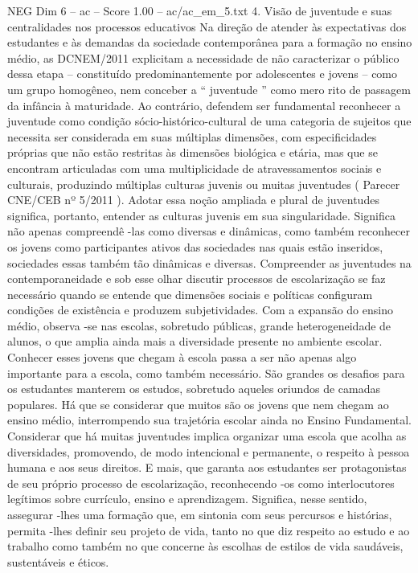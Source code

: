 \begin{textsample}{NEG Dim 6 – ac – Score 1.00 – ac/ac\_em\_5.txt}  \label{ex:f6_neg_134}
4.
Visão de juventude e suas centralidades nos processos educativos Na direção de atender às expectativas dos estudantes e às demandas da sociedade contemporânea para a formação no ensino médio, as DCNEM/2011 explicitam a necessidade de não caracterizar o público dessa etapa – constituído predominantemente por adolescentes e jovens – como um grupo homogêneo, nem conceber a “ juventude ” como mero rito de passagem da infância à maturidade.
Ao contrário, defendem ser fundamental reconhecer a juventude como condição sócio-histórico-cultural de uma categoria de sujeitos que necessita ser considerada em suas múltiplas dimensões, com especificidades próprias que não estão restritas às dimensões biológica e etária, mas que se encontram articuladas com uma multiplicidade de atravessamentos sociais e culturais, produzindo múltiplas culturas juvenis ou muitas juventudes ( Parecer CNE/CEB nº 5/2011 ).
Adotar essa noção ampliada e plural de juventudes significa, portanto, entender as culturas juvenis em sua singularidade.
Significa não apenas compreendê -las como diversas e dinâmicas, como também reconhecer os jovens como participantes ativos das sociedades nas quais estão inseridos, sociedades essas também tão dinâmicas e diversas.
Compreender as juventudes na contemporaneidade e sob esse olhar discutir processos de escolarização se faz necessário quando se entende que dimensões sociais e políticas configuram condições de existência e produzem subjetividades.
Com a expansão do ensino médio, observa -se nas escolas, sobretudo públicas, grande heterogeneidade de alunos, o que amplia ainda mais a diversidade presente no ambiente escolar.
Conhecer esses jovens que chegam à escola passa a ser não apenas algo importante para a escola, como também necessário.
São grandes os desafios para os estudantes manterem os estudos, sobretudo aqueles oriundos de camadas populares.
Há que se considerar que muitos são os jovens que nem chegam ao ensino médio, interrompendo sua trajetória escolar ainda no Ensino Fundamental.
Considerar que há muitas juventudes implica organizar uma escola que acolha as diversidades, promovendo, de modo intencional e permanente, o respeito à pessoa humana e aos seus direitos.
E mais, que garanta aos estudantes ser protagonistas de seu próprio processo de escolarização, reconhecendo -os como interlocutores legítimos sobre currículo, ensino e aprendizagem.
Significa, nesse sentido, assegurar -lhes uma formação que, em sintonia com seus percursos e histórias, permita -lhes definir seu projeto de vida, tanto no que diz respeito ao estudo e ao trabalho como também no que concerne às escolhas de estilos de vida saudáveis, sustentáveis e éticos.

\end{textsample}
